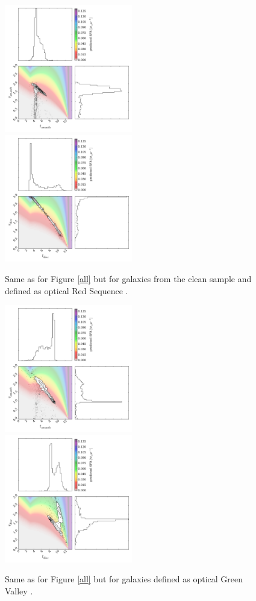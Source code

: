 \documentclass{mn2e}
\begin{document}
\begin{figure}
\includegraphics[width=0.4975\textwidth]{red_s_smooth_clean_new.pdf}
\includegraphics[width=0.4975\textwidth]{red_s_disc_clean_new.pdf}
\caption{Same as for Figure \ref{all} but for galaxies from the clean sample and defined as optical Red Sequence \cite{Baldry04}.}
\label{red_s_clean}
\end{figure}

\begin{figure}
\includegraphics[width=0.4975\textwidth]{gv_smooth.pdf}
\includegraphics[width=0.4975\textwidth]{gv_disc.pdf}
\caption{Same as for Figure \ref{all} but for galaxies defined as optical Green Valley \cite{Baldry04}.}
\label{gv}
\end{figure}
\end{document}
